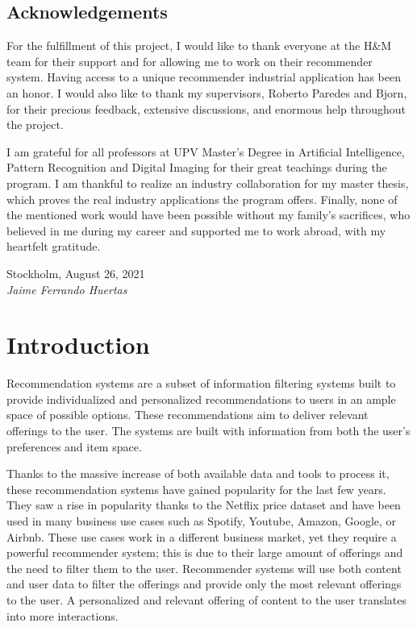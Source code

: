 \documentclass{kththesis}
\begin{document}
\section*{Acknowledgements}
For the fulfillment of this project, I would like to thank everyone at the H\&M team for their support and for allowing me to work on their recommender system. Having access to a unique recommender industrial application has been an honor. I would also like to thank my supervisors, Roberto Paredes and Bjorn, for their precious feedback, extensive discussions, and enormous help throughout the project.

I am grateful for all professors at UPV Master's Degree in Artificial Intelligence, Pattern Recognition and Digital Imaging for their great teachings during the program. I am thankful to realize an industry collaboration for my master thesis, which proves the real industry applications the program offers. Finally, none of the mentioned work would have been possible without my family's sacrifices, who believed in me during my career and supported me to work abroad, with my heartfelt gratitude.
\newline
\newline
\newline
\newline
\newline

\noindent Stockholm, August 26, 2021 \\
\noindent \textit{Jaime Ferrando Huertas}

\chapter{Introduction}

Recommendation systems are a subset of information filtering systems built to provide individualized and personalized recommendations to users in an ample space of possible options. These recommendations aim to deliver relevant offerings to the user. The systems are built with information from both the user's preferences and item space.

Thanks to the massive increase of both available data and tools to process it, these recommendation systems have gained popularity for the last few years. They saw a rise in popularity thanks to the Netflix price dataset \cite{netflix} and have been used in many business use cases such as Spotify, Youtube, Amazon, Google, or Airbnb. These use cases work in a different business market, yet they require a powerful recommender system; this is due to their large amount of offerings and the need to filter them to the user. Recommender systems will use both content and user data to filter the offerings and provide only the most relevant offerings to the user. A personalized and relevant offering of content to the user translates into more interactions.
\end{document}
